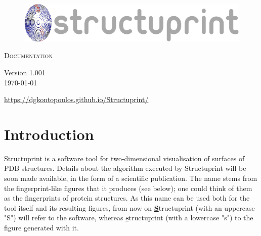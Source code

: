 \documentclass[12pt,a4paper]{article}
\begin{document}
\setmainfont{GFS Didot}

\vspace*{\fill}

\thispagestyle{empty}

\begin{center}

\begin{figure}[!htbp]
    \centering
	\includegraphics[width=\textwidth]{../src/images/splash.png}
\end{figure}

\vspace{1cm}

\textsc{\Huge{Documentation}}

\vspace{3cm}

\Large{Version 1.001\\}
\today

\vspace{3cm}

\url{https://dgkontopoulos.github.io/Structuprint/}

\end{center}

\vspace*{\fill}
\newpage

\vspace*{\fill}
\vspace{-5cm}
\tableofcontents
\vspace*{\fill}
\newpage

\section{Introduction}
Structuprint is a software tool for two-dimensional visualisation of surfaces 
of PDB structures. Details about the algorithm executed by Structuprint will be 
soon made available, in the form of a scientific publication. 
The name stems from the fingerprint-like figures that it 
produces (see below); one could think of them as the fingerprints of protein 
structures. As this name can be used both for the tool itself and its 
resulting figures, from now on \underline{\textbf{S}}tructuprint 
(with an uppercase "S") will refer to the software, whereas 
\underline{\textbf{s}}tructuprint (with a lowercase "s") to the figure 
generated with it.\\
\end{document}
